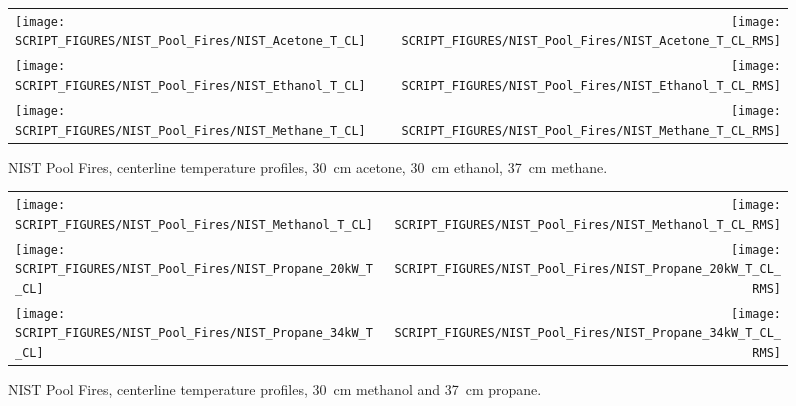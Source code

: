 \newpage

\begin{figure}[p]
\begin{tabular*}{\textwidth}{l@{\extracolsep{\fill}}r}
\texttt{[image: SCRIPT\_FIGURES/NIST\_Pool\_Fires/NIST\_Acetone\_T\_CL]} &
\texttt{[image: SCRIPT\_FIGURES/NIST\_Pool\_Fires/NIST\_Acetone\_T\_CL\_RMS]} \\
\texttt{[image: SCRIPT\_FIGURES/NIST\_Pool\_Fires/NIST\_Ethanol\_T\_CL]} &
\texttt{[image: SCRIPT\_FIGURES/NIST\_Pool\_Fires/NIST\_Ethanol\_T\_CL\_RMS]} \\
\texttt{[image: SCRIPT\_FIGURES/NIST\_Pool\_Fires/NIST\_Methane\_T\_CL]} &
\texttt{[image: SCRIPT\_FIGURES/NIST\_Pool\_Fires/NIST\_Methane\_T\_CL\_RMS]}
\end{tabular*}
\caption[NIST Pool Fires, centerline temperature, acetone, ethanol, methane]
{NIST Pool Fires, centerline temperature profiles, 30~cm acetone, 30~cm ethanol, 37~cm methane.}
\label{NIST_Pool_Fires_Temperature_1}
\end{figure}

\begin{figure}[p]
\begin{tabular*}{\textwidth}{l@{\extracolsep{\fill}}r}
\texttt{[image: SCRIPT\_FIGURES/NIST\_Pool\_Fires/NIST\_Methanol\_T\_CL]} &
\texttt{[image: SCRIPT\_FIGURES/NIST\_Pool\_Fires/NIST\_Methanol\_T\_CL\_RMS]} \\
\texttt{[image: SCRIPT\_FIGURES/NIST\_Pool\_Fires/NIST\_Propane\_20kW\_T\_CL]} &
\texttt{[image: SCRIPT\_FIGURES/NIST\_Pool\_Fires/NIST\_Propane\_20kW\_T\_CL\_RMS]} \\
\texttt{[image: SCRIPT\_FIGURES/NIST\_Pool\_Fires/NIST\_Propane\_34kW\_T\_CL]} &
\texttt{[image: SCRIPT\_FIGURES/NIST\_Pool\_Fires/NIST\_Propane\_34kW\_T\_CL\_RMS]}
\end{tabular*}
\caption[NIST Pool Fires, centerline temperature, methanol and propane]
{NIST Pool Fires, centerline temperature profiles, 30~cm methanol and 37~cm propane.}
\label{NIST_Pool_Fires_Temperature_2}
\end{figure}

